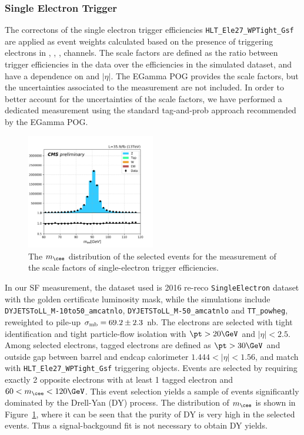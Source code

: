 \subsubsection{Single Electron Trigger}
The correctons of the single electron trigger efficiencies \texttt{HLT\_Ele27\_WPTight\_Gsf} are applied as event weights calculated based on the presence of triggering electrons in \cee, \cem, \cet, \ceh channels. The scale factors are defined as the ratio between trigger efficiencies in the data over the efficiencies in the simulated dataset, and have a dependence on \pt and $|\eta|$. The EGamma POG provides the scale factors, but the uncertainties associated to the measurement are not included. In order to better account for the uncertainties of the scale factors, we have performed a dedicated measurement using the standard tag-and-prob approach recommended by the EGamma POG.
\begin{figure}
    \centering
    \includegraphics[width=0.5\textwidth]{chapters/Analysis/sectionCalibration/figures/eTrigger/dileptonMass_tag30.png}
    \caption{The $m_{\cee}$ distribution of the selected events for the measurement of the scale factors of single-electron trigger efficiencies.}
    \label{fig:analysis:calibration:mass_ee}
\end{figure}
In our SF measurement, the dataset used  is 2016 re-reco \texttt{SingleElectron} dataset with the golden certificate luminosity mask, while the simulations include \texttt{DYJETSToLL\_M-10to50\_amcatnlo}, \texttt{DYJETSToLL\_M-50\_amcatnlo} and \texttt{TT\_powheg}, reweighted to pile-up $\sigma_{\rm mb} = 69.2\pm 2.3$ nb. The electrons are selected with tight identification and tight particle-flow isolation with $\pt>20\GeV$ and $|\eta|<2.5$. Among selected electrons, tagged electrons are defined as $\pt>30\GeV$ and outside gap between barrel and endcap calorimeter $1.444<|\eta|<1.56$, and match with \texttt{HLT\_Ele27\_WPTight\_Gsf} triggering objects. Events are selected by requiring exactly 2 opposite electrons with at least 1 tagged electron and $60<m_{\cee}<120 \GeV$. This event selection yields a sample of events significantly dominated by the Drell-Yan (DY)  process. The distribution of $m_{\cee}$ is shown in Figure~\ref{fig:analysis:calibration:mass_ee}, where it can be seen that the purity of DY is very high in the selected \cee events. Thus a signal-backgound fit is not necessary to obtain DY yields.
